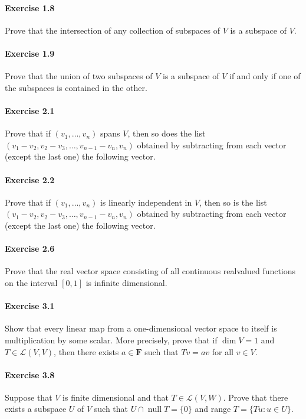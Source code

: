 \documentclass{article}
\theoremstyle{definition}
\begin{document}
\paragraph{Exercise 1.8} Prove that the intersection of any collection of subspaces of $V$ is a subspace of $V$.

\paragraph{Exercise 1.9} Prove that the union of two subspaces of $V$ is a subspace of $V$ if and only if one of the subspaces is contained in the other.

\paragraph{Exercise 2.1} Prove that if $\left(v_{1}, \ldots, v_{n}\right)$ spans $V$, then so does the list $\left(v_{1}-v_{2}, v_{2}-v_{3}, \ldots, v_{n-1}-v_{n}, v_{n}\right)$ obtained by subtracting from each vector (except the last one) the following vector.

\paragraph{Exercise 2.2} Prove that if $\left(v_{1}, \ldots, v_{n}\right)$ is linearly independent in $V$, then so is the list $\left(v_{1}-v_{2}, v_{2}-v_{3}, \ldots, v_{n-1}-v_{n}, v_{n}\right)$ obtained by subtracting from each vector (except the last one) the following vector.

\paragraph{Exercise 2.6} Prove that the real vector space consisting of all continuous realvalued functions on the interval $[0,1]$ is infinite dimensional.

\paragraph{Exercise 3.1} Show that every linear map from a one-dimensional vector space to itself is multiplication by some scalar. More precisely, prove that if $\operatorname{dim} V=1$ and $T \in \mathcal{L}(V, V)$, then there exists $a \in \mathbf{F}$ such that $T v=a v$ for all $v \in V$.

\paragraph{Exercise 3.8} Suppose that $V$ is finite dimensional and that $T \in \mathcal{L}(V, W)$. Prove that there exists a subspace $U$ of $V$ such that $U \cap \operatorname{null} T=\{0\}$ and range $T=\{T u: u \in U\}$.
\end{document}
